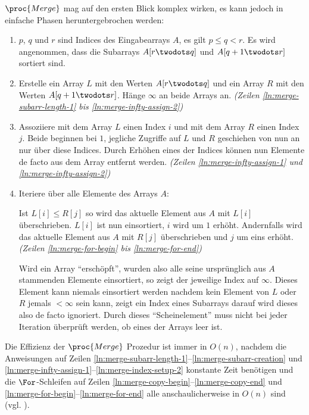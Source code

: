 $\proc{Merge}$ mag auf den ersten Blick komplex wirken, es kann jedoch in einfache Phasen heruntergebrochen werden:
\begin{enumerate}[start=0]
    \item $p$, $q$ und $r$ sind Indices des Eingabearrays $A$, es gilt $p \leq q < r$. Es wird angenommen, dass die Subarrays $A[r \twodots q]$ und $A[q + 1 \twodots r]$ sortiert sind.

    \item Erstelle ein Array $L$ mit den Werten $A[r \twodots q]$ und ein Array $R$ mit den Werten $A[q + 1 \twodots r]$. Hänge $\infty$ an beide Arrays an. \emph{(Zeilen \ref{ln:merge-subarr-length-1} bis \ref{ln:merge-infty-assign-2})}

    \item Assoziiere mit dem Array $L$ einen Index $i$ und mit dem Array $R$ einen Index $j$. Beide beginnen bei $1$, jegliche Zugriffe auf $L$ und $R$ geschiehen von nun an nur über diese Indices. Durch Erhöhen eines der Indices können nun Elemente de facto aus dem Array entfernt werden. \emph{(Zeilen \ref{ln:merge-infty-assign-1} und \ref{ln:merge-infty-assign-2})}

    \item Iteriere über alle Elemente des Arrays $A$:

    Ist $L[i] \leq R[j]$ so wird das aktuelle Element aus $A$ mit $L[i]$ überschrieben. $L[i]$ ist nun einsortiert, $i$ wird um $1$ erhöht. Andernfalls wird das aktuelle Element aus $A$ mit $R[j]$ überschrieben und $j$ um eins erhöht. \emph{(Zeilen \ref{ln:merge-for-begin} bis \ref{ln:merge-for-end})}

    Wird ein Array \enquote{erschöpft}, wurden also alle seine ursprünglich aus $A$ stammenden Elemente einsortiert, so zeigt der jeweilige Index auf $\infty$. Dieses Element kann niemals einsortiert werden nachdem kein Element von $L$ oder $R$ jemals $< \infty$ sein kann, zeigt ein Index eines Subarrays darauf wird dieses also de facto ignoriert. Durch dieses \enquote{Scheinelement} muss nicht bei jeder Iteration überprüft werden, ob eines der Arrays leer ist.
\end{enumerate}

Die Effizienz der $\proc{Merge}$ Prozedur ist immer in $O(n)$, nachdem die Anweisungen auf Zeilen \ref{ln:merge-subarr-length-1}--\ref{ln:merge-subarr-creation} und \ref{ln:merge-infty-assign-1}--\ref{ln:merge-index-setup-2} konstante Zeit benötigen und die $\For$-Schleifen auf Zeilen \ref{ln:merge-copy-begin}--\ref{ln:merge-copy-end} und \ref{ln:merge-for-begin}--\ref{ln:merge-for-end} alle anschaulicherweise in $O(n)$ sind (vgl. \cite[34]{clrs2001}).

